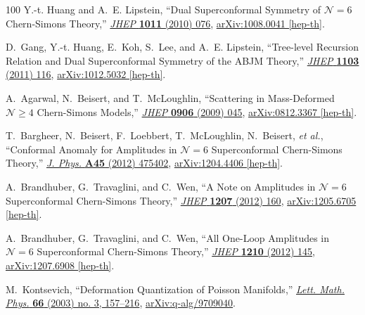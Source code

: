 \documentclass[12pt,hyperref,compress]{JHEP3}
\begin{document}
\begin{thebibliography}{100}
Y.-t. Huang and A.~E. Lipstein, ``{Dual Superconformal Symmetry of
  $\mathcal{N}\!=\!6$ Chern-Simons Theory},''
  \href{http://dx.doi.org/10.1007/JHEP11(2010)076}{{\em JHEP} {\bf 1011} (2010)
   076},
\href{http://arxiv.org/abs/1008.0041}{{ arXiv:1008.0041 [hep-th]}}.

D.~Gang, Y.-t. Huang, E.~Koh, S.~Lee, and A.~E. Lipstein, ``{Tree-level
  Recursion Relation and Dual Superconformal Symmetry of the ABJM Theory},''
  \href{http://dx.doi.org/10.1007/JHEP03(2011)116}{{\em JHEP} {\bf 1103} (2011)
   116},
\href{http://arxiv.org/abs/1012.5032}{{ arXiv:1012.5032 [hep-th]}}.

A.~Agarwal, N.~Beisert, and T.~McLoughlin, ``{Scattering in Mass-Deformed
  $\mathcal{N}\!\geq\!4$ Chern-Simons Models},''
  \href{http://dx.doi.org/10.1088/1126-6708/2009/06/045}{{\em JHEP} {\bf 0906}
  (2009)  045},
\href{http://arxiv.org/abs/0812.3367}{{ arXiv:0812.3367 [hep-th]}}.

T.~Bargheer, N.~Beisert, F.~Loebbert, T.~McLoughlin, N.~Beisert, {\em et al.},
  ``{Conformal Anomaly for Amplitudes in $\mathcal{N}\!=\!6$ Superconformal
  Chern-Simons Theory},''
  \href{http://dx.doi.org/10.1088/1751-8113/45/47/475402}{{\em J. Phys.} {\bf
  A45} (2012)  475402},
\href{http://arxiv.org/abs/1204.4406}{{ arXiv:1204.4406 [hep-th]}}.

A.~Brandhuber, G.~Travaglini, and C.~Wen, ``{A Note on Amplitudes in
  $\mathcal{N}\!=\!6$ Superconformal Chern-Simons Theory},''
  \href{http://dx.doi.org/10.1007/JHEP07(2012)160}{{\em JHEP} {\bf 1207} (2012)
   160},
\href{http://arxiv.org/abs/1205.6705}{{ arXiv:1205.6705 [hep-th]}}.

A.~Brandhuber, G.~Travaglini, and C.~Wen, ``{All One-Loop Amplitudes in
  $\mathcal{N}\!=\!6$ Superconformal Chern-Simons Theory},''
  \href{http://dx.doi.org/10.1007/JHEP10(2012)145}{{\em JHEP} {\bf 1210} (2012)
   145},
\href{http://arxiv.org/abs/1207.6908}{{ arXiv:1207.6908 [hep-th]}}.

M.~Kontsevich, ``{Deformation Quantization of {P}oisson Manifolds},''
  \href{http://dx.doi.org/10.1023/B:MATH.0000027508.00421.bf}{{\em Lett. Math.
  Phys.} {\bf 66} (2003) no. 3, 157--216},
  \href{http://arxiv.org/abs/q-alg/9709040}{{ arXiv:q-alg/9709040}}.


\end{thebibliography}
\end{document}

